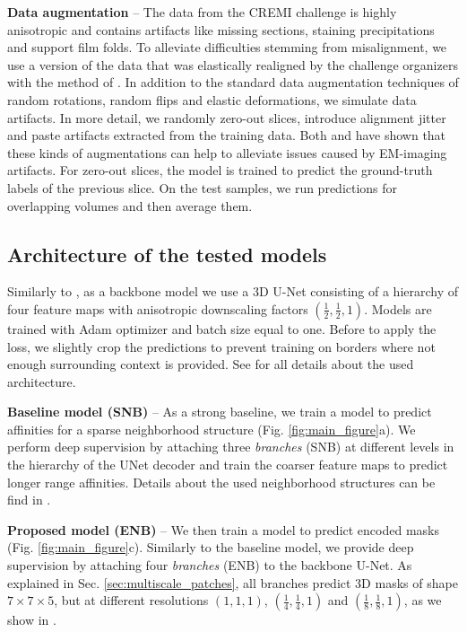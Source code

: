 \textbf{Data augmentation} -- The data from the CREMI challenge is highly \linebreak anisotropic and contains artifacts like missing sections, staining precipitations and support film folds. 
To alleviate difficulties stemming from misalignment, we use a version of the data that was elastically realigned by the challenge organizers with the method of \cite{saalfeld2012elastic}.
In addition to the standard data augmentation techniques of random rotations, random flips and  elastic deformations, we simulate data artifacts.
In more detail, we randomly zero-out slices, introduce alignment jitter and paste artifacts extracted from the training data. Both \cite{funke2018large} and \cite{lee2017superhuman} have shown
that these kinds of augmentations can help to alleviate issues caused by EM-imaging artifacts. For zero-out slices, the model is trained to predict the ground-truth labels of the previous slice.
On the test samples, we run predictions for overlapping volumes and then average them.


 
 


\subsection{Architecture of the tested models}
Similarly to \cite{lee2019learning,lee2017superhuman,wolf2018mutex}, as a backbone model we use a 3D U-Net consisting of a hierarchy of four feature maps with anisotropic downscaling factors $(\frac{1}{2},\frac{1}{2},1)$. 
Models are trained with Adam optimizer and batch size equal to one. Before to apply the loss, we slightly crop the predictions to prevent training on borders where not enough surrounding context is provided. 
See  for all details about the used architecture. 

 
\textbf{Baseline model (SNB)} -- As a strong baseline, we train a model to predict affinities for a sparse neighborhood structure (Fig. \ref{fig:main_figure}a). We perform deep supervision by attaching three \emph{\sparseBr branches} (SNB) at different levels in the hierarchy of the UNet decoder and train the coarser feature maps to predict longer range affinities. Details about the used neighborhood structures can be find in .

\textbf{Proposed model (ENB)} -- We then train a model to predict encoded \maskname masks (Fig. \ref{fig:main_figure}c). Similarly to the baseline model, we provide deep supervision by attaching four \emph{\encBr branches} (ENB) to the backbone U-Net. As explained in Sec. \ref{sec:multiscale_patches}, all branches predict 3D masks of shape $7 \times 7 \times 5$, but at different resolutions $(1,1,1)$, $(\frac{1}{4},\frac{1}{4},1)$ and $(\frac{1}{8},\frac{1}{8},1)$, as we show in .

